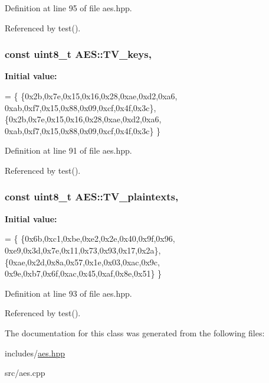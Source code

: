 Definition at line 95 of file aes.\+hpp.



Referenced by test().

\hypertarget{classAES_af860c29be27726f8ad48a420c5724692}{}
\subsubsection[{T\+V\+\_\+keys}]{\setlength{\rightskip}{0pt plus 5cm}const uint8\+\_\+t A\+E\+S\+::\+T\+V\+\_\+keys\hspace{0.3cm}{\ttfamily [static]}, {\ttfamily [private]}}\label{classAES_af860c29be27726f8ad48a420c5724692}
{\bfseries Initial value\+:}
\begin{DoxyCode}
= \{
  \{0x2b,0x7e,0x15,0x16,0x28,0xae,0xd2,0xa6,
   0xab,0xf7,0x15,0x88,0x09,0xcf,0x4f,0x3c\},
  \{0x2b,0x7e,0x15,0x16,0x28,0xae,0xd2,0xa6,
   0xab,0xf7,0x15,0x88,0x09,0xcf,0x4f,0x3c\}
\}
\end{DoxyCode}


Definition at line 91 of file aes.\+hpp.



Referenced by test().

\hypertarget{classAES_a9e58e7326fc7597ebed6185191015378}{}
\subsubsection[{T\+V\+\_\+plaintexts}]{\setlength{\rightskip}{0pt plus 5cm}const uint8\+\_\+t A\+E\+S\+::\+T\+V\+\_\+plaintexts\hspace{0.3cm}{\ttfamily [static]}, {\ttfamily [private]}}\label{classAES_a9e58e7326fc7597ebed6185191015378}
{\bfseries Initial value\+:}
\begin{DoxyCode}
= \{
  \{0x6b,0xc1,0xbe,0xe2,0x2e,0x40,0x9f,0x96,
   0xe9,0x3d,0x7e,0x11,0x73,0x93,0x17,0x2a\},
  \{0xae,0x2d,0x8a,0x57,0x1e,0x03,0xac,0x9c,
   0x9e,0xb7,0x6f,0xac,0x45,0xaf,0x8e,0x51\}
\}
\end{DoxyCode}


Definition at line 93 of file aes.\+hpp.



Referenced by test().



The documentation for this class was generated from the following files\+:\begin{DoxyCompactItemize}
\item 
includes/\hyperlink{aes_8hpp}{aes.\+hpp}\item 
src/aes.\+cpp\end{DoxyCompactItemize}

